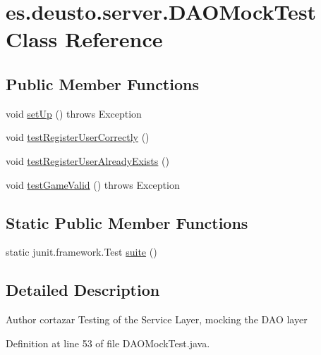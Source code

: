 \hypertarget{classes_1_1deusto_1_1server_1_1_d_a_o_mock_test}{}\section{es.\+deusto.\+server.\+D\+A\+O\+Mock\+Test Class Reference}
\label{classes_1_1deusto_1_1server_1_1_d_a_o_mock_test}
\subsection*{Public Member Functions}
\begin{DoxyCompactItemize}
\item 
void \hyperlink{classes_1_1deusto_1_1server_1_1_d_a_o_mock_test_aa5b5750c57bea368660f61349b5a1b44}{set\+Up} ()  throws Exception 
\item 
void \hyperlink{classes_1_1deusto_1_1server_1_1_d_a_o_mock_test_a130e22cffc04eaf64f676f3bd990842e}{test\+Register\+User\+Correctly} ()
\item 
void \hyperlink{classes_1_1deusto_1_1server_1_1_d_a_o_mock_test_ad1bc82a076c6efbe4119405df120e9f7}{test\+Register\+User\+Already\+Exists} ()
\item 
void \hyperlink{classes_1_1deusto_1_1server_1_1_d_a_o_mock_test_a54ba8b12cdb1c6e74fdabb8f6341ced5}{test\+Game\+Valid} ()  throws Exception 
\end{DoxyCompactItemize}
\subsection*{Static Public Member Functions}
\begin{DoxyCompactItemize}
\item 
static junit.\+framework.\+Test \hyperlink{classes_1_1deusto_1_1server_1_1_d_a_o_mock_test_a22f78cde67ca8ab6f7b09ce4b946495c}{suite} ()
\end{DoxyCompactItemize}


\subsection{Detailed Description}
\begin{DoxyAuthor}{Author}
cortazar Testing of the Service Layer, mocking the D\+AO layer 
\end{DoxyAuthor}


Definition at line 53 of file D\+A\+O\+Mock\+Test.\+java.



